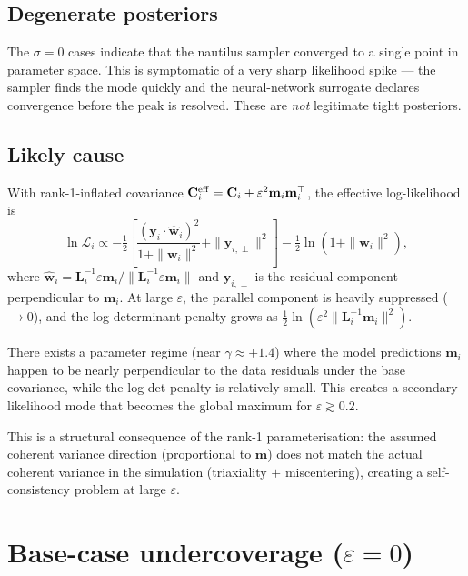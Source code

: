\documentclass[11pt,a4paper]{article}
\begin{document}
\subsection{Degenerate posteriors}

The $\sigma=0$ cases indicate that the nautilus sampler converged to a single
point in parameter space.  This is symptomatic of a very sharp likelihood spike
— the sampler finds the mode quickly and the neural-network surrogate declares
convergence before the peak is resolved.  These are \emph{not} legitimate
tight posteriors.

\subsection{Likely cause}

With rank-1-inflated covariance
$\mathbf{C}_i^{\rm eff} = \mathbf{C}_i + \varepsilon^2 \mathbf{m}_i\mathbf{m}_i^\top$,
the effective log-likelihood is
\begin{equation}
  \ln\mathcal{L}_i \propto
  -\tfrac12 \left[
    \frac{(\mathbf{y}_i\cdot\hat{\mathbf{w}}_i)^2}{1+\|\mathbf{w}_i\|^2}
    + \|\mathbf{y}_{i,\perp}\|^2
  \right]
  - \tfrac12 \ln(1 + \|\mathbf{w}_i\|^2),
\end{equation}
where $\hat{\mathbf{w}}_i = \mathbf{L}_i^{-1}\varepsilon\mathbf{m}_i /
\|\mathbf{L}_i^{-1}\varepsilon\mathbf{m}_i\|$ and
$\mathbf{y}_{i,\perp}$ is the residual component perpendicular to
$\mathbf{m}_i$.  At large $\varepsilon$, the parallel component is
heavily suppressed ($\to 0$), and the log-determinant penalty grows as
$\tfrac12\ln(\varepsilon^2\|\mathbf{L}_i^{-1}\mathbf{m}_i\|^2)$.

There exists a parameter regime (near $\gamma\approx+1.4$) where the model
predictions $\mathbf{m}_i$ happen to be nearly perpendicular to the data
residuals under the base covariance, while the log-det penalty is relatively
small.  This creates a secondary likelihood mode that becomes the global
maximum for $\varepsilon \gtrsim 0.2$.

This is a structural consequence of the rank-1 parameterisation: the assumed
coherent variance direction (proportional to $\mathbf{m}$) does not match
the actual coherent variance in the simulation (triaxiality $+$ miscentering),
creating a self-consistency problem at large $\varepsilon$.

\section{Base-case undercoverage ($\varepsilon = 0$)}
\end{document}
